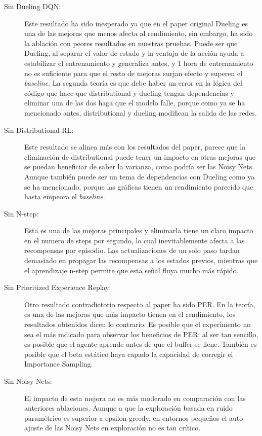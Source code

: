 \documentclass[onecolumn]{cwpreport} %
\begin{document}
\begin{description}
    \item[Sin Dueling DQN:] Este resultado ha sido inesperado ya que en el paper original Dueling es una de las mejoras que menos afecta al rendimiento, sin embargo, ha sido la ablación con peores resultados en nuestras pruebas. Puede ser que Dueling, al separar el valor de estado y la ventaja de la acción ayuda a estabilizar el entrenamiento y generaliza antes, y 1 hora de entrenamiento no es suficiente para que el resto de mejoras surjan efecto y superen el \textit{baseline}. La segunda teoría es que debe haber un error en la lógica del código que hace que distributional y dueling tengan dependencias y eliminar una de las dos haga que el modelo falle, porque como ya se ha mencionado antes, distributional y dueling modifican la salida de las redes.
    
    \item[Sin Distributional RL:] Este resultado se alinea más con los resultados del paper, parece que la eliminación de distributional puede tener un impacto en otras mejoras que se puedan beneficiar de saber la varianza, como podría ser las Noisy Nets. Aunque también puede ser un tema de dependencias con Dueling como ya se ha mencionado, porque las gráficas tienen un rendimiento parecido que hasta empeora el \textit{baseline}.
    
    \item[Sin N-step:] Esta es una de las mejoras principales y eliminarla tiene un claro impacto en el numero de steps por segundo, lo cual inevitablemente afecta a las recompensas por episodio. Las actualizaciones de un solo paso tardan demasiado en propagar las recompensas a los estados previos, mientras que el aprendizaje n-step permite que esta señal fluya mucho más rápido.
    
    \item[Sin Prioritized Experience Replay:] Otro resultado contradictorio respecto al paper ha sido PER. En la teoría, es una de las mejoras que más impacto tienen en el rendimiento, los resultados obtenidos dicen lo contrario. Es posible que el experimento no sea el más indicado para observar los beneficios de PER; al ser tan sencillo, es posible que el agente aprende antes de que el buffer se llene. También es posible que el beta estático haya capado la capacidad de corregir el Importance Sampling.
    
    \item[Sin Noisy Nets:] El impacto de esta mejora no es más moderado en comparación con las anteriores ablaciones. Aunque a que la exploración basada en ruido paramétrico es superior a epsilon-greedy, en entornos pequeños el auto-ajuste de las Noisy Nets en exploración no es tan crítico.
    

\end{description}
\end{document}
